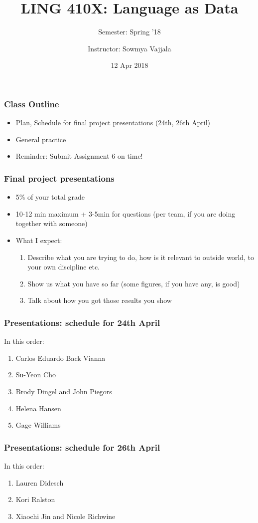 \documentclass{beamer}
\author[Sowmya Vajjala]{Instructor: Sowmya Vajjala}
\title[LING 410X]{LING 410X: Language as Data}
\subtitle{Semester: Spring '18}
\date{12 Apr 2018}
\institute{Iowa State University, USA}
\begin{document}
\begin{frame}\titlepage
\end{frame}

\begin{frame}
\frametitle{Class Outline}
\begin{itemize}
\item Plan, Schedule for final project presentations (24th, 26th April)
\item General practice 
\item Reminder: Submit Assignment 6 on time! 
\end{itemize}
\end{frame}

\begin{frame}
\frametitle{Final project presentations}
\begin{itemize}
\item 5\% of your total grade
\item 10-12 min maximum + 3-5min for questions (per team, if you are doing together with someone)
\item What I expect: 
\begin{enumerate}
\item Describe what you are trying to do, how is it relevant to outside world, to your own discipline etc.
\item Show us what you have so far (some figures, if you have any, is good)
\item Talk about how you got those results you show
\end{enumerate}
\end{itemize}
\end{frame}

\begin{frame}
\frametitle{Presentations: schedule for 24th April}
In this order:
\begin{enumerate}
\item Carlos Eduardo Back Vianna
\item Su-Yeon Cho
\item Brody Dingel and John Piegors
\item Helena Hansen
\item Gage Williams
\end{enumerate}
\end{frame}

\begin{frame}
\frametitle{Presentations: schedule for 26th April}
In this order:
\begin{enumerate}
\item Lauren Didesch
\item Kori Ralston
\item Xiaochi Jin and Nicole Richwine
\end{enumerate}
\end{frame}
\end{document}
